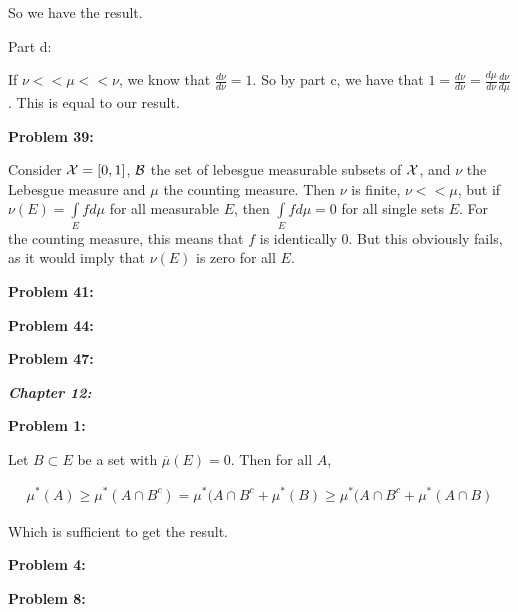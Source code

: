 \documentclass[a4paper,12pt]{article}
\begin{document}
So we have the result.

\shunt

Part d:

If $\nu << \mu << \nu$, we know that $\frac{d\nu}{d\nu} = 1$. So by part c, we have that $1=\frac{d\nu}{d\nu}=\frac{d\mu}{d\nu}\frac{d\nu}{d\mu}$. This is equal to our result.

\shunt

{\bf Problem 39:}

Consider $\mathcal{X}= [0,1]$, $\mathcal{B}$ the set of lebesgue measurable subsets of $\mathcal{X}$, and $\nu$ the Lebesgue measure and $\mu$ the counting measure. Then $\nu$ is finite, $\nu << \mu$, but if $\nu(E) = \int\limits_E f d\mu$ for all measurable $E$, then $\int\limits_E f d\mu = 0$ for all single sets $E$. For the counting measure, this means that $f$ is identically $0$. But this obviously fails, as it would imply that $\nu(E)$ is zero for all $E$.

\shunt

{\bf Problem 41:}


\shunt

{\bf Problem 44:}


\shunt

{\bf Problem 47:}

\pagebreak

{\Huge{\textit{\textbf{Chapter 12:}}}}

\shunt

{\bf Problem 1:}

Let $B \subset E$ be a set with $\overline{\mu}(E) = 0$. Then for all $A$,

\begin{align*}
\mu^*(A) \geq \mu^*(A \cap B^c) = \mu^*(A \cap B^c + \mu^*(B) \geq \mu^*(A \cap B^c + \mu^*(A \cap B)
\end{align*}

Which is sufficient to get the result.

\shunt

{\bf Problem 4:}

\shunt

{\bf Problem 8:}

\shunt
\end{document}
